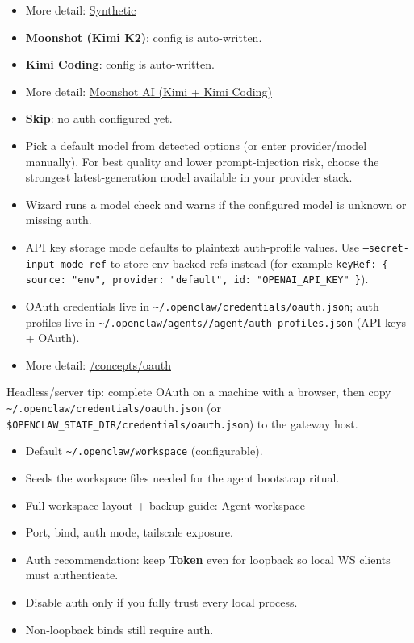 \begin{itemize}
  \item More detail: \href{/providers/synthetic}{Synthetic}
  \item \textbf{Moonshot (Kimi K2)}: config is auto-written.
  \item \textbf{Kimi Coding}: config is auto-written.
  \item More detail: \href{/providers/moonshot}{Moonshot AI (Kimi + Kimi Coding)}
  \item \textbf{Skip}: no auth configured yet.
  \item Pick a default model from detected options (or enter provider/model manually). For best quality and lower prompt-injection risk, choose the strongest latest-generation model available in your provider stack.
  \item Wizard runs a model check and warns if the configured model is unknown or missing auth.
  \item API key storage mode defaults to plaintext auth-profile values. Use \texttt{--secret-input-mode ref} to store env-backed refs instead (for example \texttt{keyRef: \{ source: "env", provider: "default", id: "OPENAI\_API\_KEY" \}}).
  \item OAuth credentials live in \texttt{\textasciitilde{}/.openclaw/credentials/oauth.json}; auth profiles live in \texttt{\textasciitilde{}/.openclaw/agents//agent/auth-profiles.json} (API keys + OAuth).
  \item More detail: \href{/concepts/oauth}{/concepts/oauth}
\end{itemize}

Headless/server tip: complete OAuth on a machine with a browser, then copy
\texttt{\textasciitilde{}/.openclaw/credentials/oauth.json} (or \texttt{\$OPENCLAW\_STATE\_DIR/credentials/oauth.json}) to the
gateway host.
\begin{itemize}
  \item Default \texttt{\textasciitilde{}/.openclaw/workspace} (configurable).
  \item Seeds the workspace files needed for the agent bootstrap ritual.
  \item Full workspace layout + backup guide: \href{/concepts/agent-workspace}{Agent workspace}
\end{itemize}

\begin{itemize}
  \item Port, bind, auth mode, tailscale exposure.
  \item Auth recommendation: keep \textbf{Token} even for loopback so local WS clients must authenticate.
  \item Disable auth only if you fully trust every local process.
  \item Non‑loopback binds still require auth.
\end{itemize}

